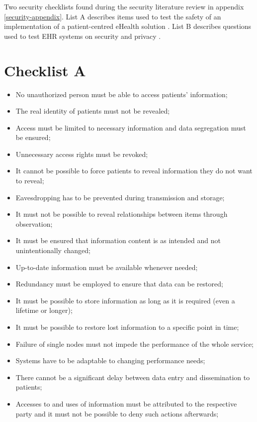 Two security checklists found during the security literature review in appendix \ref{security-appendix}.
List A describes items used to test the safety of an implementation of a patient-centred eHealth solution \cite{s17Dehling2014}.
List B describes questions used to test EHR systems on security and privacy \cite{s8FernandezAleman2013}.

\section{Checklist A}
\label{security-checklists-a}

\begin{itemize}
	\item No unauthorized person must be able to access patients' information;
	\item The real identity of patients must not be revealed;
	\item Access must be limited to necessary information and data segregation must be ensured;
	\item Unnecessary access rights must be revoked;
	\item It cannot be possible to force patients to reveal information they do not want to reveal;
	\item Eavesdropping has to be prevented during transmission and storage;
	\item It must not be possible to reveal relationships between items through observation;
	\item It must be ensured that information content is as intended and not unintentionally changed;
	\item Up-to-date information must be available whenever needed;
	\item Redundancy must be employed to ensure that data can be restored;
	\item It must be possible to store information as long as it is required (even a lifetime or longer);
	\item It must be possible to restore lost information to a specific point in time;
	\item Failure of single nodes must not impede the performance of the whole service;
	\item Systems have to be adaptable to changing performance needs;
	\item There cannot be a significant delay between data entry and dissemination to patients;
	\item Accesses to and uses of information must be attributed to the respective party and it must not be possible to deny such actions afterwards;

\end{itemize}
